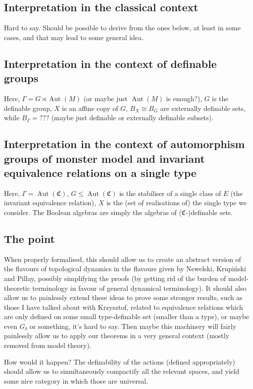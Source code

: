 \documentclass[final,a4paper,12pt]{amsart}
\theoremstyle{remark}
\theoremstyle{definition}
\DeclareMathOperator{\Aut}{{Aut}}
\newcommand{\mon}{\mathfrak C}
\let\Gamma\varGamma
\begin{document}
	\subsection{Interpretation in the classical context}
	Hard to say. Should be possible to derive from the ones below, at least in some cases, and that may lead to some general idea.
	
	\subsection{Interpretation in the context of definable groups}
	Here, $\Gamma=G\rtimes \Aut(M)$ (or maybe just $\Aut(M)$ is enough?), $G$ is the definable group, $X$ is an affine copy of $G$, $B_X\cong B_G$ are externally definable sets, while $B_\Gamma=???$ (maybe just definable or externally definable subsets).
	
	\subsection{Interpretation in the context of automorphism groups of monster model and invariant equivalence relations on a single type}	
	Here, $\Gamma=\Aut(\mon)$, $G\leq \Aut(\mon)$ is the stabiliser of a single class of $E$ (the invariant equivalence relation), $X$ is the (set of realisations of) the single type we consider. The Boolean algebras are simply the algebras of ($\mon$-)definable sets.
	
	\subsection{The point}
	When properly formalised, this should allow us to create an abstract version of the flavours of topological dynamics in the flavours given by Newelski, Krupiński and Pillay, possibly simplifying the proofs (by getting rid of the burden of model-theoretic terminology in favour of general dynamical terminology). It should also allow us to painlessly extend these ideas to prove some stronger results, such as those I have talked about with Krzysztof, related to equivalence relations which are only defined on some small type-definable set (smaller than a type), or maybe even $G_\delta$ or something, it's hard to say. Then maybe this machinery will fairly painlessly allow us to apply our theorems in a very general context (mostly removed from model theory).
	
	How would it happen? The definability of the actions (defined appropriately) should allow us to simultaneously compactify all the relevant spaces, and yield some nice category in which those are universal.
	
\end{document}
